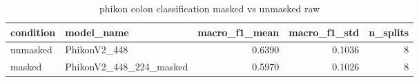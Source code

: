 \begin{table}
\caption{phikon colon classification masked vs unmasked raw}
\label{tab:phikon_colon_classification_masked_vs_unmasked_raw}
\begin{tabular}{llrrr}
\toprule
condition & model_name & macro_f1_mean & macro_f1_std & n_splits \\
\midrule
unmasked & PhikonV2_448 & 0.6390 & 0.1036 & 8 \\
masked & PhikonV2_448_224_masked & 0.5970 & 0.1026 & 8 \\
\bottomrule
\end{tabular}
\end{table}
